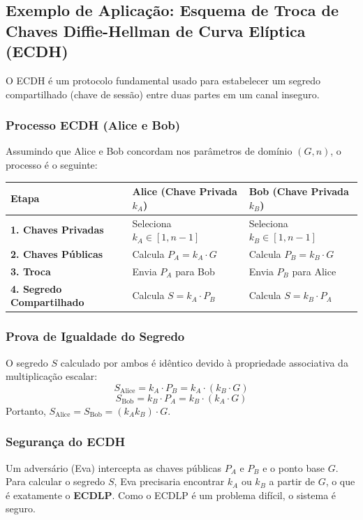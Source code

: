 \documentclass{article}
\theoremstyle{definicao_estilo}
\begin{document}
\subsection{Exemplo de Aplicação: Esquema de Troca de Chaves Diffie-Hellman de Curva Elíptica (ECDH)}
O ECDH é um protocolo fundamental usado para estabelecer um segredo compartilhado (chave de sessão) entre duas partes em um canal inseguro.

\subsubsection{Processo ECDH (Alice e Bob)}
Assumindo que Alice e Bob concordam nos parâmetros de domínio $(G, n)$, o processo é o seguinte:

\begin{center}
\begin{tabular}{|>{\bfseries}p{1.8cm}|p{4.5cm}|p{4.5cm}|}
\hline
\textbf{Etapa} & \textbf{Alice (Chave Privada $k_A$)} & \textbf{Bob (Chave Privada $k_B$)} \\
\hline
\textbf{1. Chaves Privadas} & Seleciona $k_A \in [1, n-1]$ & Seleciona $k_B \in [1, n-1]$ \\
\hline
\textbf{2. Chaves Públicas} & Calcula $P_A = k_A \cdot G$ & Calcula $P_B = k_B \cdot G$ \\
\hline
\textbf{3. Troca} & Envia $P_A$ para Bob & Envia $P_B$ para Alice \\
\hline
\textbf{4. Segredo Compartilhado} & Calcula $S = k_A \cdot P_B$ & Calcula $S = k_B \cdot P_A$ \\
\hline
\end{tabular}
\end{center}

\subsubsection{Prova de Igualdade do Segredo}
O segredo $S$ calculado por ambos é idêntico devido à propriedade associativa da multiplicação escalar:
$$ S_{\text{Alice}} = k_A \cdot P_B = k_A \cdot (k_B \cdot G) $$
$$ S_{\text{Bob}} = k_B \cdot P_A = k_B \cdot (k_A \cdot G) $$
Portanto, $S_{\text{Alice}} = S_{\text{Bob}} = (k_A k_B) \cdot G$.

\subsubsection{Segurança do ECDH}
Um adversário (Eva) intercepta as chaves públicas $P_A$ e $P_B$ e o ponto base $G$. Para calcular o segredo $S$, Eva precisaria encontrar $k_A$ ou $k_B$ a partir de $G$, o que é exatamente o \textbf{ECDLP}. Como o ECDLP é um problema difícil, o sistema é seguro.
\end{document}

